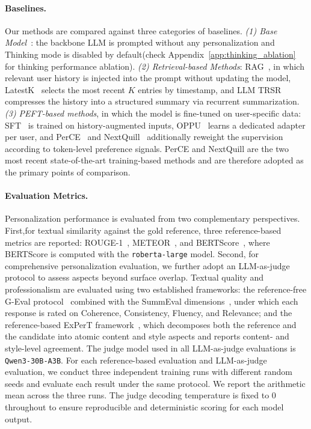 \documentclass{article} %
\begin{document}
\paragraph{Baselines.}
Our methods are compared against three categories of baselines. \textit{(1) Base Model}~\citep{qwen3}: the
backbone LLM is prompted without any personalization and Thinking mode is disabled by default(check Appendix~\ref{app:thinking_ablation} for thinking performance ablation). \textit{(2) Retrieval-based Methods}: RAG~\citep{ragbase}, in which relevant user history is injected into the prompt without updating the model, LatestK~\citep{pplug} selects the most recent $K$ entries by timestamp, and LLM TRSR~\citep{TRSR} compresses the history into a structured
summary via recurrent summarization. \textit{(3) PEFT-based methods}, in which the model is fine-tuned on user-specific data: SFT~\citep{lora} is trained on history-augmented inputs, OPPU~\citep{oppu}
learns a dedicated adapter per user, and PerCE~\citep{PerCE} and NextQuill~\citep{nextquill} additionally reweight the supervision according to token-level preference signals. PerCE and NextQuill are the two most recent state-of-the-art training-based methods and are therefore adopted as the primary points of comparison.

\paragraph{Evaluation Metrics.}
Personalization performance is evaluated from two complementary perspectives. First,for textual similarity against the gold reference, three reference-based metrics are reported: ROUGE-1~\citep{rouge}, METEOR~\citep{meteor}, and BERTScore~\citep{bertscore}, where BERTScore is computed with the \texttt{roberta-large} model. Second, for comprehensive personalization evaluation, we further adopt an LLM-as-judge protocol to assess aspects beyond surface overlap. Textual quality and professionalism are evaluated using two established frameworks: the reference-free G-Eval protocol~\citep{geval} combined with the SummEval dimensions~\citep{summeval}, under which each response is rated on Coherence, Consistency, Fluency, and Relevance; and the reference-based ExPerT framework~\citep{expert}, which decomposes both the reference and the candidate into atomic content and style aspects and reports content- and style-level agreement. The judge model used in all LLM-as-judge evaluations is \texttt{Qwen3-30B-A3B}. For each reference-based evaluation and LLM-as-judge evaluation, we conduct three independent training runs with different random seeds and evaluate each
result under the same protocol. We report the arithmetic mean across the three runs. The judge decoding temperature is fixed to $0$ throughout to ensure reproducible and deterministic scoring for each model output.
\end{document}
